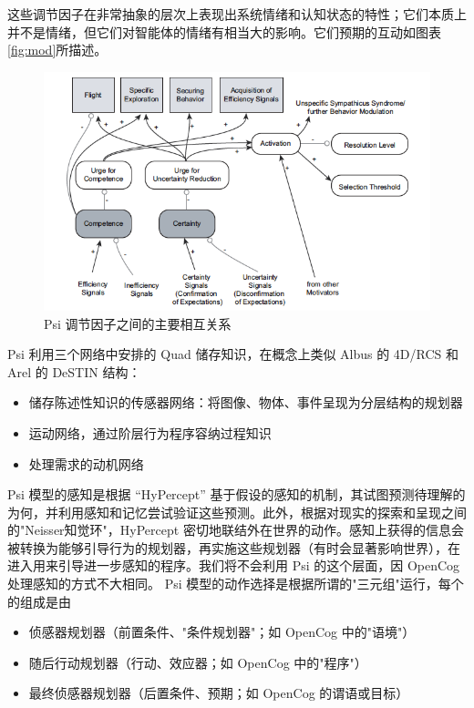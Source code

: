 这些调节因子在非常抽象的层次上表现出系统情绪和认知状态的特性；它们本质上并不是情绪，但它们对智能体的情绪有相当大的影响。它们预期的互动如图表\ref{fig:mod}所描述。


\begin{figure}[htb]
\centering
\includegraphics[width=12cm]{figures/PsiModulators.png}
\caption{Psi 调节因子之间的主要相互关系}
\label{fig:Mod}
\end{figure}

Psi 利用三个网络中安排的 Quad 储存知识，在概念上类似 Albus 的 4D/RCS 和 Arel 的 DeSTIN 结构：

\begin{itemize}

\item 储存陈述性知识的传感器网络：将图像、物体、事件呈现为分层结构的规划器 
\item 运动网络，通过阶层行为程序容纳过程知识
\item 处理需求的动机网络

\end{itemize}

Psi 模型的感知是根据 “HyPercept” 基于假设的感知的机制，其试图预测待理解的为何，并利用感知和记忆尝试验证这些预测。此外，根据对现实的探索和呈现之间的"Neisser知觉环"，HyPercept 密切地联结外在世界的动作。感知上获得的信息会被转换为能够引导行为的规划器，再实施这些规划器（有时会显著影响世界），在进入用来引导进一步感知的程序。我们将不会利用 Psi 的这个层面，因 OpenCog 处理感知的方式不大相同。 
Psi 模型的动作选择是根据所谓的"三元组"运行，每个的组成是由

\begin{itemize}
\item 侦感器规划器（前置条件、"条件规划器"；如 OpenCog 中的"语境"）
\item 随后行动规划器（行动、效应器；如 OpenCog 中的"程序"） 
\item 最终侦感器规划器（后置条件、预期；如 OpenCog 的谓语或目标）
\end{itemize}

